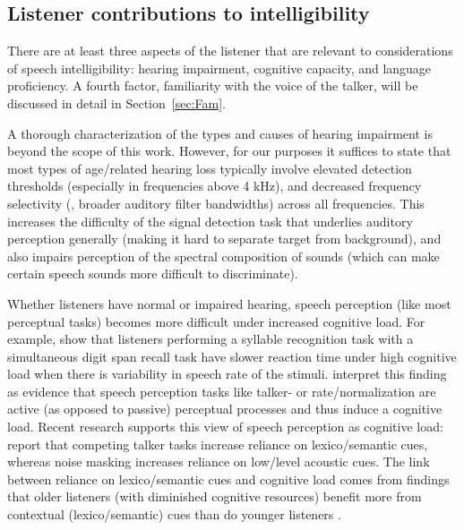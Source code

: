 \subsection{Listener contributions to intelligibility\label{sec:Listener}}
There are at least three aspects of the listener that are relevant to considerations of speech intelligibility: hearing impairment, cognitive capacity, and language proficiency.  A fourth factor, familiarity with the voice of the talker, will be discussed in detail in Section~\ref{sec:Fam}.  

A thorough characterization of the types and causes of hearing impairment is beyond the scope of this work.\footnotemark{}  However, for our purposes it suffices to state that most types of age\-/related hearing loss typically involve elevated detection thresholds (especially in frequencies above 4 kHz), and decreased frequency selectivity (\ie, broader auditory filter bandwidths) across all frequencies.  This increases the difficulty of the signal detection task that underlies auditory perception generally (making it hard to separate target from background), and also impairs perception of the spectral composition of sounds (which can make certain speech sounds more difficult to discriminate).

Whether listeners have normal or impaired hearing, speech perception (like most perceptual tasks) becomes more difficult under increased cognitive load.  For example, \citet{FrancisNusbaum1996} show that listeners performing a syllable recognition task with a simultaneous digit span recall task have slower reaction time under high cognitive load when there is variability in speech rate of the stimuli.  \citeauthor*{FrancisNusbaum1996} interpret this finding as evidence that speech perception tasks like talker- or rate\-/normalization are active (as opposed to passive) perceptual processes and thus induce a cognitive load.  Recent research supports this view of speech perception as cognitive load: \citet{MattysEtAl2009} report that competing talker tasks increase reliance on lexico\-/semantic cues, whereas noise masking increases reliance on low\-/level acoustic cues.  The link between reliance on lexico\-/semantic cues and cognitive load comes from findings that older listeners (with diminished cognitive resources) benefit more from contextual (lexico\-/semantic) cues than do younger listeners \citep{PichoraFullerEtAl1995, SommersDanielson1999}.  %

